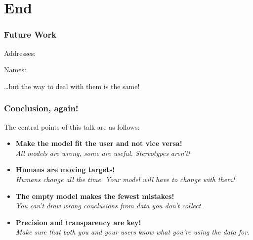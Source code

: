 \documentclass[aspectratio=169,x11names]{beamer}
\begin{document}
\section{End}

\begin{frame}
\frametitle{Future Work}

\begin{minipage}{0.5\textwidth}
\Large
Addresses:
\large
\end{minipage}\pause%
\begin{minipage}{0.5\textwidth}
\Large
Names:
\large
\end{minipage}
\pause\bigskip\large

\begin{center}
\dots but the way to deal with them is the same!
\end{center}

\end{frame}

\begin{frame}
\frametitle{Conclusion, again!}
\large
The central points of this talk are as follows:\bigskip

\begin{itemize}
\item \textbf{Make the model fit the user and not vice versa!}\\
\emph{All models are wrong, some are useful. Stereotypes aren't!}\medskip
\item \textbf{Humans are moving targets!}\\
\emph{Humans change all the time. Your model will have to change with them!}\medskip
\item \textbf{The empty model makes the fewest mistakes!}\\
\emph{You can't draw wrong conclusions from data you don't collect.}\medskip
\item \textbf{Precision and transparency are key!}\\
\emph{Make sure that both you and your users know what you're using the data for.}
\end{itemize}

\end{frame}
\end{document}
